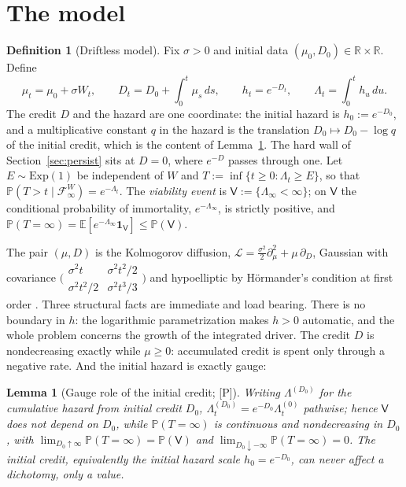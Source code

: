 \documentclass[11pt]{article}
\newtheorem{lemma}[theorem]{Lemma}
\theoremstyle{definition}
\newtheorem{definition}[theorem]{Definition}
\theoremstyle{remark}
\newcommand{\PP}{\mathbb{P}}
\newcommand{\E}{\mathbb{E}}
\newcommand{\R}{\mathbb{R}}
\newcommand{\one}{\mathbf{1}}
\newcommand{\Fc}{\mathcal{F}}
\newcommand{\Lc}{\mathcal{L}}
\newcommand{\Imm}{\mathsf{V}}
\begin{document}
\section{The model}\label{sec:model}

\begin{definition}[Driftless model]\label{def:model}
Fix $\sigma>0$ and initial data $(\mu_0,D_0)\in\R\times\R$. Define
\begin{equation}\label{eq:model}
\mu_t=\mu_0+\sigma W_t,\qquad
D_t=D_0+\int_0^t\mu_s\,ds,\qquad
h_t=e^{-D_t},\qquad
\Lambda_t=\int_0^t h_u\,du .
\end{equation}
The credit $D$ and the hazard are one coordinate: the initial hazard
is $h_0:=e^{-D_0}$, and a multiplicative constant $q$ in the hazard
is the translation $D_0\mapsto D_0-\log q$ of the initial credit,
which is the content of Lemma~\ref{lem:gauge}. The hard wall of
Section~\ref{sec:persist} sits at $D=0$, where $e^{-D}$ passes
through one.
Let $E\sim\mathrm{Exp}(1)$ be independent of $W$ and
$T:=\inf\{t\ge0:\Lambda_t\ge E\}$, so that
$\PP(T>t\mid\Fc^W_\infty)=e^{-\Lambda_t}$. The \emph{viability event}
is $\Imm:=\{\Lambda_\infty<\infty\}$; on $\Imm$ the conditional
probability of immortality, $e^{-\Lambda_\infty}$, is strictly
positive, and
$\PP(T=\infty)=\E[e^{-\Lambda_\infty}\one_\Imm]\le\PP(\Imm)$.
\end{definition}

The pair $(\mu,D)$ is the Kolmogorov diffusion,
$\Lc=\tfrac{\sigma^2}{2}\partial_\mu^2+\mu\,\partial_D$, Gaussian with
covariance
$\bigl(\begin{smallmatrix}\sigma^2t&\sigma^2t^2/2\\
\sigma^2t^2/2&\sigma^2t^3/3\end{smallmatrix}\bigr)$
and hypoelliptic by H\"ormander's condition at first order
\cite{Kol34,Hor67}. Three structural facts are immediate and load
bearing. There is no boundary in $h$: the logarithmic parametrization
makes $h>0$ automatic, and the whole problem concerns the growth of
the integrated driver. The credit $D$ is nondecreasing exactly while
$\mu\ge0$: accumulated credit is spent only through a negative rate.
And the initial hazard is exactly gauge:

\begin{lemma}[Gauge role of the initial credit; {[P]}]\label{lem:gauge}
Writing $\Lambda^{(D_0)}$ for the cumulative hazard from initial
credit $D_0$, $\Lambda^{(D_0)}_t=e^{-D_0}\Lambda^{(0)}_t$ pathwise;
hence $\Imm$ does not depend on $D_0$, while $\PP(T=\infty)$ is
continuous and nondecreasing in $D_0$, with
$\lim_{D_0\uparrow\infty}\PP(T=\infty)=\PP(\Imm)$ and
$\lim_{D_0\downarrow-\infty}\PP(T=\infty)=0$. The initial credit,
equivalently the initial hazard scale $h_0=e^{-D_0}$, can never affect
a dichotomy, only a value.
\end{lemma}
\end{document}
